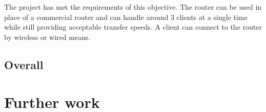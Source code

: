 The project has met the requirements of this objective. The router can be used in place of a commercial router and can handle around 3 clients at a single time while still providing acceptable transfer speeds. A client can connect to the router by wireless or wired means.

\subsection{Overall}

\section{Further work}
